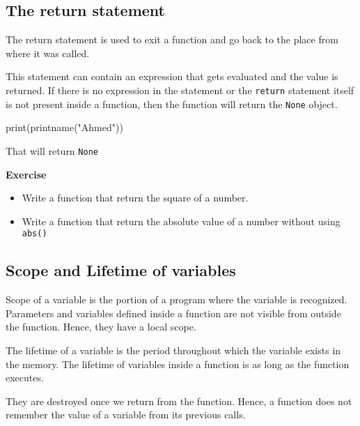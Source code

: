 \documentclass[11pt]{article}
\providecommand{\tightlist}{%
      \setlength{\itemsep}{0pt}\setlength{\parskip}{0pt}}
\newenvironment{Shaded}{}{}
\newcommand{\StringTok}[1]{\textcolor[rgb]{0.25,0.44,0.63}{{#1}}}
\newcommand{\NormalTok}[1]{{#1}}
\newcommand{\BuiltInTok}[1]{{#1}}
\begin{document}
\hypertarget{the-return-statement}{%
\subsection{The return statement}\label{the-return-statement}}

The return statement is used to exit a function and go back to the place
from where it was called.

This statement can contain an expression that gets evaluated and the
value is returned. If there is no expression in the statement or the
\texttt{return} statement itself is not present inside a function, then
the function will return the \texttt{None} object.

\begin{Shaded}
\begin{Highlighting}[]
    \BuiltInTok{print}\NormalTok{(printname(}\StringTok{"Ahmed"}\NormalTok{))}
\end{Highlighting}
\end{Shaded}

That will return \texttt{None}

\textbf{Exercise}

\begin{itemize}
\tightlist
\item
  Write a function that return the square of a number.
\item
  Write a function that return the absolute value of a number without
  using \texttt{abs()}
\end{itemize}

\hypertarget{scope-and-lifetime-of-variables}{%
\subsection{Scope and Lifetime of
variables}\label{scope-and-lifetime-of-variables}}

Scope of a variable is the portion of a program where the variable is
recognized. Parameters and variables defined inside a function are not
visible from outside the function. Hence, they have a local scope.

The lifetime of a variable is the period throughout which the variable
exists in the memory. The lifetime of variables inside a function is as
long as the function executes.

They are destroyed once we return from the function. Hence, a function
does not remember the value of a variable from its previous calls.
\end{document}
